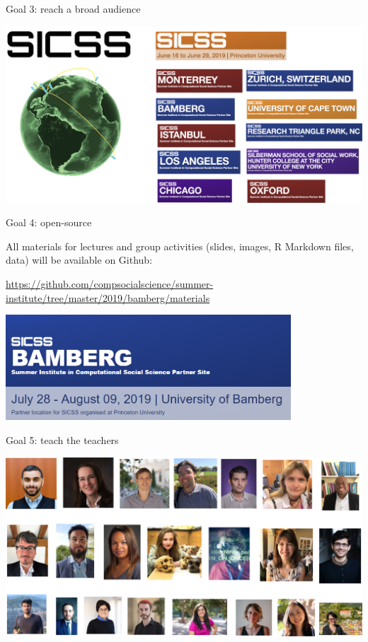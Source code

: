 \documentclass{beamer}
\begin{document}
\begin{frame}{Goal 3: reach a broad audience}

\begin{center}
\includegraphics[width=1.0\textwidth]{figures/sicss_world.png}
\end{center}

\end{frame}

\begin{frame}{Goal 4: open-source}



All materials for lectures and group activities (slides, images, R Markdown files, data) will be available on Github:

\url{https://github.com/compsocialscience/summer-institute/tree/master/2019/bamberg/materials}

\begin{center}
	\includegraphics[width=0.8\textwidth]{figures/sicss_bamberg.png}
\end{center}

\end{frame}

\begin{frame}{Goal 5: teach the teachers}

\begin{center}
\includegraphics[width=1.0\textwidth]{figures/alumni_leaders.png}
\end{center}

\end{frame}
\end{document}
